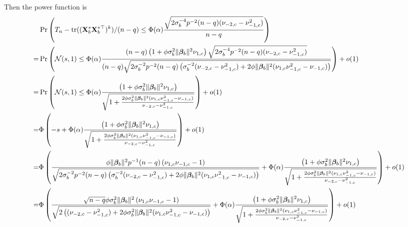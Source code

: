 \documentclass[11pt]{article}
\DeclareMathOperator{\mytr}{tr}
\newcommand{\bfsym}[1]{\ensuremath{\boldsymbol{#1}}}
\def\bbeta{\bfsym \beta}
\theoremstyle{plain}
\theoremstyle{definition}
\theoremstyle{remark}
\begin{document}
Then the power function is
\begin{equation*}
    \begin{split}
    &\Pr
    \left(
        T_n - \mytr((\BX_b^* \BX_b^{*\top})^{k})/(n-q)
        \leq
    \Phi(\alpha) 
    \frac{
        \sqrt{
    2\sigma_b^{-4} p^{-2} (n-q)
         (\nu_{-2,c} - \nu_{-1,c}^2)
}
    }{
     n-q
    } 
\right)
\\
=&
\Pr\left( \mathcal N (s,1)
    \leq
    \Phi(\alpha) 
    \frac{
(n-q)\left(
            1+ \phi \sigma_b^2 \|\bbeta_b\|^2  \nu_{1,c}
\right)
        \sqrt{
    2\sigma_b^{-4} p^{-2} (n-q)
         (\nu_{-2,c} - \nu_{-1,c}^2)
}
    }{
        (n-q)
        \sqrt{
    2\sigma_b^{-2} p^{-2} (n-q)
    \left( 
        \sigma_b^{-2} (\nu_{-2,c} - \nu_{-1,c}^2)
        +
        2\phi \|\bbeta_b\|^2 (\nu_{1,c} \nu_{-1,c}^2 -\nu_{-1,c})
    \right)
}
    } 
\right)
+o(1)
\\
=&
\Pr\left( \mathcal N (s,1)
    \leq
    \Phi(\alpha) 
    \frac{
\left(
            1+ \phi \sigma_b^2 \|\bbeta_b\|^2  \nu_{1,c}
\right)
    }{
        \sqrt{
            1
        +
        \frac{
            2\phi \sigma_b^2 \|\bbeta_b\|^2 (\nu_{1,c} \nu_{-1,c}^2 -\nu_{-1,c})
        }{\nu_{-2,c} - \nu_{-1,c}^2}
}
    } 
\right)
+o(1)
\\
=&
\Phi\left( 
    -s
    +
    \Phi(\alpha) 
    \frac{
\left(
            1+ \phi \sigma_b^2 \|\bbeta_b\|^2  \nu_{1,c}
\right)
    }{
        \sqrt{
            1
        +
        \frac{
            2\phi \sigma_b^2 \|\bbeta_b\|^2 (\nu_{1,c} \nu_{-1,c}^2 -\nu_{-1,c})
        }{\nu_{-2,c} - \nu_{-1,c}^2}
}
    } 
\right)
+o(1)
\\
=&
\Phi\left( 
    \frac{
\phi \|\bbeta_b\|^2 p^{-1} (n-q) \left(\nu_{1,c}\nu_{-1,c}-1\right)
    }{
    \sqrt{
    2\sigma_b^{-2} p^{-2} (n-q)
    \left( 
        \sigma_b^{-2} (\nu_{-2,c} - \nu_{-1,c}^2)
        +
        2\phi \|\bbeta_b\|^2 (\nu_{1,c} \nu_{-1,c}^2 -\nu_{-1,c})
    \right)
}
    }
    +
    \Phi(\alpha) 
    \frac{
\left(
            1+ \phi \sigma_b^2 \|\bbeta_b\|^2  \nu_{1,c}
\right)
    }{
        \sqrt{
            1
        +
        \frac{
            2\phi \sigma_b^2 \|\bbeta_b\|^2 (\nu_{1,c} \nu_{-1,c}^2 -\nu_{-1,c})
        }{\nu_{-2,c} - \nu_{-1,c}^2}
}
    } 
\right)
+o(1)
\\
=&
\Phi\left( 
    \frac{
       \sqrt{n-q}  \phi \sigma_b^2 \|\bbeta_b\|^2  \left(\nu_{1,c}\nu_{-1,c}-1\right)
    }{
    \sqrt{
    2  
    \left( 
         (\nu_{-2,c} - \nu_{-1,c}^2)
        +
        2\phi \sigma_b^2 \|\bbeta_b\|^2 (\nu_{1,c} \nu_{-1,c}^2 -\nu_{-1,c})
    \right)
}
    }
    +
    \Phi(\alpha) 
    \frac{
\left(
            1+ \phi \sigma_b^2 \|\bbeta_b\|^2  \nu_{1,c}
\right)
    }{
        \sqrt{
            1
        +
        \frac{
            2\phi \sigma_b^2 \|\bbeta_b\|^2 (\nu_{1,c} \nu_{-1,c}^2 -\nu_{-1,c})
        }{\nu_{-2,c} - \nu_{-1,c}^2}
}
    } 
\right)
+o(1)
    \end{split}
\end{equation*}
\end{document}

